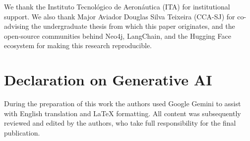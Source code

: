 \documentclass{ceurart}
\begin{document}
\begin{acknowledgments}
We thank the Instituto Tecnológico de Aeronáutica (ITA) for institutional
support. We also thank Major Aviador Douglas Silva Teixeira (CCA-SJ) for
co-advising the undergraduate thesis from which this paper originates, and the
open-source communities behind Neo4j, LangChain, and the Hugging Face ecosystem
for making this research reproducible.
\end{acknowledgments}

\section*{Declaration on Generative AI}
During the preparation of this work the authors used Google Gemini to assist
with English translation and \LaTeX{} formatting. All content was subsequently
reviewed and edited by the authors, who take full responsibility for the final
publication.


\end{document}
